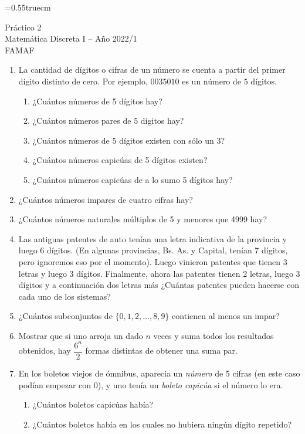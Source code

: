 \documentclass[a4paper,12pt,twoside,spanish,reqno]{amsbook}
\numberwithin{equation}{section}
\begin{document}
    \baselineskip=0.55truecm %
    


{\bf \begin{center} \large  Práctico 2 \\ Matemática Discreta I -- Año 2022/1 \\ FAMAF \end{center}}


\begin {enumerate}
\setlength\itemsep{1.1em}

\item La cantidad de dígitos o cifras de un número se cuenta a partir del primer dígito distinto de cero. Por ejemplo, $0035010$ es un número de $5$ dígitos.
\begin{enumerate}
\item ¿Cuántos números de 5 dígitos hay?
\item ¿Cuántos números pares de 5 dígitos  hay?
\item ¿Cuántos números de 5 dígitos existen con sólo un 3?
\item ¿Cuántos números capicúas de 5 dígitos existen?
\item ¿Cuántos números capicúas de a lo sumo 5 dígitos hay?
\end{enumerate}


\item ¿Cuántos números impares de cuatro cifras hay?


\item ¿Cuántos números naturales múltiplos de  5 y menores que 4999 hay?


\item Las antiguas patentes de auto tenían una letra indicativa de la provincia y luego 6 dígitos. (En algunas provincias, Bs. As. y Capital, tenían 7 dígitos, pero ignoremos eso por el momento). Luego  vinieron patentes que tienen 3 letras y luego 3 dígitos. Finalmente, ahora las patentes tienen 2 letras, luego 3 dígitos y a continuación dos letras más ¿Cuántas patentes pueden hacerse con cada uno de los sistemas?


\item ¿Cuántos subconjuntos de $\{0,1,2,\dots,8,9\}$ contienen al menos un impar?


\item Mostrar que si uno arroja un dado $n$ veces y suma todos los resultados obtenidos, hay $\dfrac{6^n}{2}$ formas distintas de obtener una suma par.


\item En los boletos viejos de ómnibus, aparecía un {\em número} de 5 cifras (en este caso podían empezar con 0), y uno tenía un {\it boleto capicúa} si el número lo era.
\begin{enumerate}
	\item ¿Cuántos boletos capicúas había?
	\item ¿Cuántos boletos había en los cuales no hubiera ningún dígito repetido?
\end{enumerate}



\end{enumerate}
\end{document}
